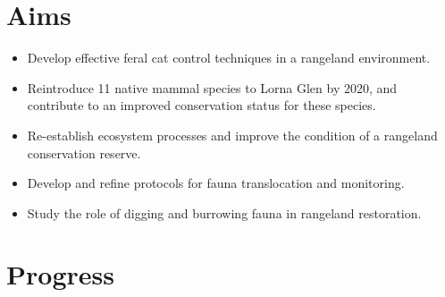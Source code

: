 \documentclass[version=last,
    paper=a4,                               %
    10pt,                                   %
    dvipsnames,
    oneside,                              %
    headings=openany,                       %
    open=any,
    BCOR=7mm,                               %
    DIV=15,     %
]{scrbook}
\begin{document}
\section*{Aims}

\begin{itemize}
\itemsep1pt\parskip0pt
\item
  Develop effective feral cat control techniques in a rangeland
  environment.
\item
  Reintroduce 11 native mammal species to Lorna Glen by 2020, and
  contribute to an improved conservation status for these species.
\item
  Re-establish ecosystem processes and improve the condition of a
  rangeland conservation reserve.
\item
  Develop and refine protocols for fauna translocation and monitoring.
\item
  Study the role of digging and burrowing fauna in rangeland
  restoration.
\end{itemize}




\section*{Progress}
\end{document}
